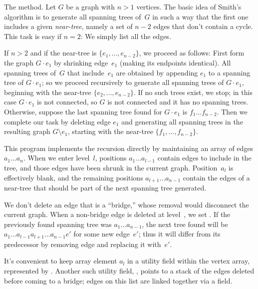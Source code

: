 The method. Let $G$ be a graph with $n>1$ vertices.
The basic idea of Smith's algorithm is to generate all spanning trees of~$G$
in such a way that the first one includes a given {\it near-tree}, namely
a set of $n-2$ edges that don't contain a cycle. This task is easy if $n=2$:
We simply list all the edges.

If $n>2$ and if the near-tree is $\{e_1,\ldots,e_{n-2}\}$, we proceed as
follows: First form the graph $G\cdot e_1$ by shrinking edge~$e_1$ (making its
endpoints identical). All spanning trees of~$G$ that include~$e_1$ are
obtained by appending $e_1$ to a spanning tree of $G\cdot e_1$; so we
proceed recursively to generate all spanning trees of $G\cdot e_1$,
beginning with the near-tree $\{e_2,\ldots,e_{n-2}\}$. If no such
trees exist, we stop; in this case $G\cdot e_1$ is not connected,
so $G$ is not connected and it has no spanning trees.
Otherwise, suppose the last spanning tree found
for $G\cdot e_1$ is $f_1\ldots f_{n-2}$. Then we complete our task by
deleting edge $e_1$ and generating all spanning trees in the resulting
graph $G\setminus e_1$, starting with the near-tree $\{f_1,\ldots,f_{n-2}\}$.

\fi

This program implements the recursion directly by
maintaining an array
of edges $a_1\ldots a_n$. When we enter level~$l$, positions $a_1\ldots
a_{l-1}$ contain edges to include in the tree, and those edges have
been shrunk in the current graph. Position~$a_l$ is effectively blank,
and the remaining positions $a_{l+1}\ldots a_{n-1}$ contain the edges
of a near-tree that should be part of the next spanning tree generated.

We don't delete an edge that is a ``bridge,'' whose removal
would disconnect the current graph. When a non-bridge edge  is deleted
at
level~, we set . If the previously
found spanning tree was $a_1\ldots a_{n-1}$, the next tree found
will be $a_1\ldots a_{l-1}a_{l+1}\ldots a_{n-1}e'$ for some new edge~$e'$;
thus it will differ from its predecessor by removing edge 
and replacing it with~$e'$.

It's convenient to keep array element $a_l$ in a utility field within
the vertex array, represented by . Another such utility field,
, points to a stack of the edges deleted before coming
to a bridge; edges on this list are linked together via a  field.

